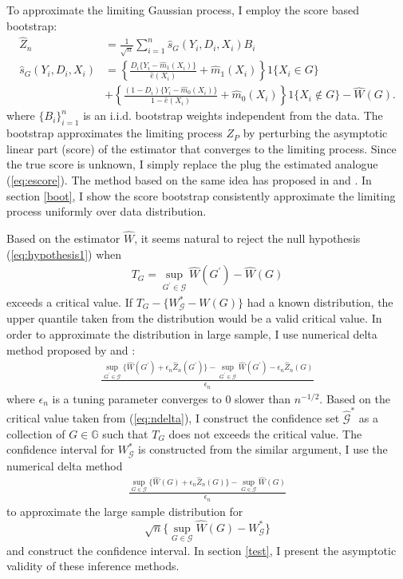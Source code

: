 \documentclass[12pt,oneside,reqno,english]{amsart}
\theoremstyle{definition}
\begin{document}
To approximate the limiting Gaussian process, I employ the score based bootstrap:
\begin{align}
\hat{Z}_{n}&=\frac{1}{\sqrt{n}}\sum_{i=1}^{n}\hat{s}_{G}(Y_{i},D_{i},X_{i})B_{i}\label{eq:boot}\\
\hat{s}_{G}(Y_{i},D_{i},X_{i})&=
\left\{\frac{D_{i}\{Y_{i}-\hat{m}_{1}(X_{i})\}}{\hat{e}(X_{i})}+\hat{m}_{1}(X_{i})\right\}1\{X_{i}\in G\}\nonumber\\
&  +\left\{\frac{(1-D_{i})\{Y_{i}-\hat{m}_{0}(X_{i})\}}{1-\hat{e}(X_{i})}+\hat{m}_{0}(X_{i}) \right\}1\{X_{i}\not\in G\}-\hat{W}(G).\label{eq:escore}
\end{align}
where $\{B_{i}\}_{i=1}^{n}$ is an i.i.d. bootstrap weights independent from the data. 
The bootstrap approximates the limiting process $Z_{P}$ by perturbing the asymptotic linear part (score) of the estimator that converges to the limiting process. 
Since the true score is unknown, I simply replace the plug the estimated analogue (\ref{eq:escore}). 
The method based on the same idea has proposed in 
\cite{KS:12} and \cite{BCFH:17}. 
In section \ref{boot}, I show the score bootstrap consistently approximate the limiting process uniformly over data distribution. 

Based on the estimator $\hat{W}$, it seems natural to reject the null hypothesis (\ref{eq:hypothesis1}) when 
\begin{align}
T_{G}=\sup_{G^{\prime}\in \mathcal{G}}\hat{W}(G^{\prime})-\hat{W}(G)\label{eq:teststat}
\end{align}
exceeds a critical value. If $T_{G}-\{W^{*}_{\mathcal{G}}-W(G)\}$ had a known distribution, 
the upper quantile taken from the distribution would be a valid critical value. \cite{Dumbgen:93}
In order to approximate the distribution in large sample, I use numerical delta method proposed by \cite{Dumbgen:93} and \cite{HL:18}:
\begin{align}
\frac{\sup_{G^{\prime}\in \mathcal{G}}\{\hat{W}(G^{\prime})+\epsilon_{n}\hat{Z}_{n}(G^{\prime})\}-\sup_{G^{\prime}\in \mathcal{G}}\hat{W}(G^{\prime})
-\epsilon_{n}\hat{Z}_{n}(G)}{\epsilon_{n}}\label{eq:ndelta}
\end{align}
where $\epsilon_{n}$ is a tuning parameter converges to $0$ slower than $n^{-1/2}$. 
Based on the critical value taken from (\ref{eq:ndelta}), I construct the confidence set $\hat{\mathcal{G}}^{*}$ as a collection of $G\in \mathbb{G}$ 
such that $T_{G}$ does not exceeds the critical value. The confidence interval for $W^{*}_{\mathcal{G}}$ is constructed from the similar argument, 
I use the numerical delta method  
\begin{align}
\frac{\sup_{G\in \mathcal{G}}\{\hat{W}(G)+\epsilon_{n}\hat{Z}_{n}(G)\}-\sup_{G\in \mathcal{G}}\hat{W}(G)
}{\epsilon_{n}}
\end{align}
to approximate the large sample distribution for 
\[\sqrt{n}\{\sup_{G\in \mathcal{G}}\hat{W}(G)-W^{*}_{\mathcal{G}}\}\]
and construct the confidence interval. 
In section \ref{test}, I present the asymptotic validity of these inference methods.
\end{document}
